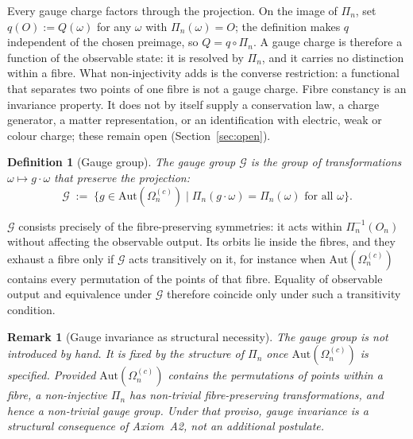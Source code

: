\documentclass[11pt,a4paper]{article}
\newtheorem{definition}[theorem]{Definition}
\newtheorem{remark}[theorem]{Remark}
\begin{document}
    Every gauge charge factors through the projection.
    On the image of $\Pi_n$, set $q(O) := Q(\omega)$ for any $\omega$ with $\Pi_n(\omega) = O$; the
    definition makes $q$ independent of the chosen preimage, so $Q = q \circ \Pi_n$.
    A gauge charge is therefore a function of the observable state: it is resolved by $\Pi_n$, and it
    carries no distinction within a fibre.
    What non-injectivity adds is the converse restriction: a functional that separates two points of
    one fibre is not a gauge charge.
    Fibre constancy is an invariance property.
    It does not by itself supply a conservation law, a charge generator, a matter representation, or
    an identification with electric, weak or colour charge; these remain open (Section~\ref{sec:open}).

    \begin{definition}[Gauge group]
      \label{def:gauge-group}
      The \emph{gauge group} $\mathcal{G}$ is the group of transformations
      $\omega \mapsto g \cdot \omega$ that preserve the projection:
      \begin{equation}
        \mathcal{G}
        \;:=\;
        \bigl\{g \in \mathrm{Aut}(\Omega_n^{(c)}) \mid
        \Pi_n(g \cdot \omega) = \Pi_n(\omega) \text{ for all } \omega \bigr\}.
      \end{equation}
    \end{definition}

    $\mathcal{G}$ consists precisely of the fibre-preserving symmetries: it acts
    within $\Pi_n^{-1}(O_n)$ without affecting the observable output.
    Its orbits lie inside the fibres, and they exhaust a fibre only if $\mathcal{G}$ acts transitively
    on it, for instance when $\mathrm{Aut}(\Omega_n^{(c)})$ contains every permutation of the points of
    that fibre.
    Equality of observable output and equivalence under $\mathcal{G}$ therefore coincide only under
    such a transitivity condition.

    \begin{remark}[Gauge invariance as structural necessity]
        The gauge group is not introduced by hand.
        It is fixed by the structure of $\Pi_n$ once $\mathrm{Aut}(\Omega_n^{(c)})$ is specified.
        Provided $\mathrm{Aut}(\Omega_n^{(c)})$ contains the permutations of points within a
        fibre, a non-injective $\Pi_n$ has non-trivial fibre-preserving transformations, and
        hence a non-trivial gauge group.
        Under that proviso, gauge invariance is a structural consequence of Axiom~A2, not an
        additional postulate.
    \end{remark}
\end{document}
